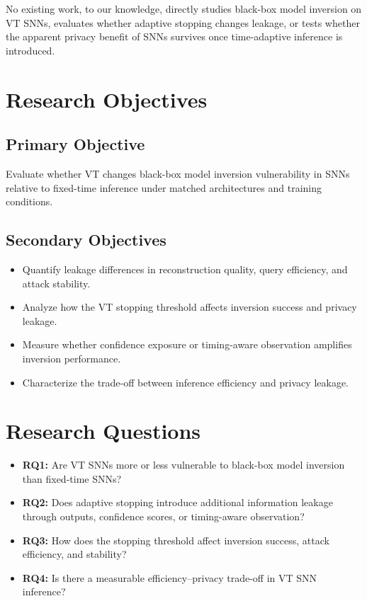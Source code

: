 \documentclass[11pt]{article}
\begin{document}
No existing work, to our knowledge, directly studies black-box model inversion on VT SNNs, evaluates whether adaptive stopping changes leakage, or tests whether the apparent privacy benefit of SNNs survives once time-adaptive inference is introduced.

\section{Research Objectives}
\subsection{Primary Objective}
Evaluate whether VT changes black-box model inversion vulnerability in SNNs relative to fixed-time inference under matched architectures and training conditions.

\subsection{Secondary Objectives}
\begin{itemize}[leftmargin=1.3em]
\item Quantify leakage differences in reconstruction quality, query efficiency, and attack stability.
\item Analyze how the VT stopping threshold affects inversion success and privacy leakage.
\item Measure whether confidence exposure or timing-aware observation amplifies inversion performance.
\item Characterize the trade-off between inference efficiency and privacy leakage.
\end{itemize}

\section{Research Questions}
\begin{itemize}[leftmargin=1.3em]
\item \textbf{RQ1:} Are VT SNNs more or less vulnerable to black-box model inversion than fixed-time SNNs?
\item \textbf{RQ2:} Does adaptive stopping introduce additional information leakage through outputs, confidence scores, or timing-aware observation?
\item \textbf{RQ3:} How does the stopping threshold affect inversion success, attack efficiency, and stability?
\item \textbf{RQ4:} Is there a measurable efficiency--privacy trade-off in VT SNN inference?
\end{itemize}
\end{document}
